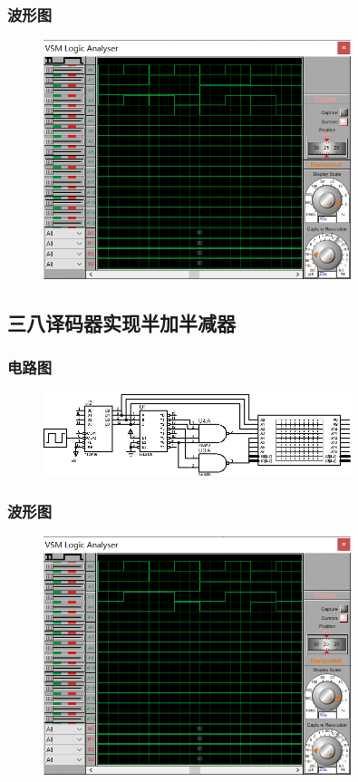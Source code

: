 \documentclass[UTF8, a4paper, 11pt]{article}
\begin{document}
\subsubsection{波形图}
\begin{figure}[H]
    \centering
    \includegraphics[width=0.8\textwidth]{ex5.2波形图.png}
\end{figure}
\subsection{三八译码器实现半加半减器}
\subsubsection{电路图}
\begin{figure}[H]
    \centering
    \includegraphics[width=0.8\textwidth]{ex5.3电路图.jpg}
\end{figure}
\subsubsection{波形图}
\begin{figure}[H]
    \centering
    \includegraphics[width=0.8\textwidth]{ex5.3波形图.png}
\end{figure}
\end{document}
